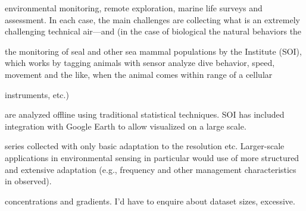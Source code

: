 \documentclass[times]{cpeauth}
\begin{document}


environmental monitoring, remote exploration, marine life surveys and %
assessment. In each case, the main challenges are collecting %
what is an extremely challenging technical %
air---and (in the case of biological %
the natural behaviors the %


the monitoring of seal and other sea mammal populations by the %
Institute (SOI), which works by tagging animals with sensor %
analyze dive behavior, speed, movement and the like, %
when the animal comes within range of a cellular %

instruments, etc.)

are analyzed offline using traditional statistical techniques.  %
SOI has included integration with Google Earth to allow %
visualized on a large scale.



series collected with only basic adaptation to the resolution etc.  %
Larger-scale applications in environmental sensing in particular would %
use of more structured and extensive adaptation (e.g., %
frequency and other management characteristics in %
observed).


concentrations and gradients. I'd have to enquire about dataset sizes, %
excessive.
\end{document}
